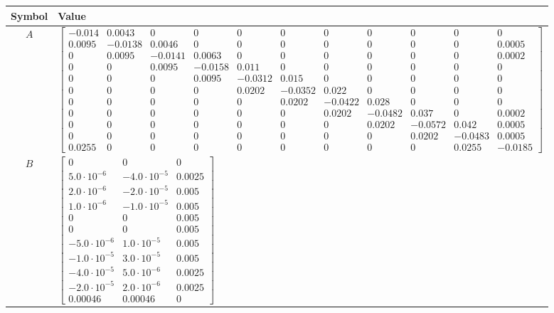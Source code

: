 \begin{tabular}{cl}
\hline
  Symbol  & Value                                                                                                                                                                                                                                                                                                                                                                                                                                                                                                                                                                                                                                                                                                                               \\
\hline
   $A$    & $\left[\begin{array}{ccccccccccc}-0.014 & 0.0043 & 0 & 0 & 0 & 0 & 0 & 0 & 0 & 0 & 0\\0.0095 & -0.0138 & 0.0046 & 0 & 0 & 0 & 0 & 0 & 0 & 0 & 0.0005\\0 & 0.0095 & -0.0141 & 0.0063 & 0 & 0 & 0 & 0 & 0 & 0 & 0.0002\\0 & 0 & 0.0095 & -0.0158 & 0.011 & 0 & 0 & 0 & 0 & 0 & 0\\0 & 0 & 0 & 0.0095 & -0.0312 & 0.015 & 0 & 0 & 0 & 0 & 0\\0 & 0 & 0 & 0 & 0.0202 & -0.0352 & 0.022 & 0 & 0 & 0 & 0\\0 & 0 & 0 & 0 & 0 & 0.0202 & -0.0422 & 0.028 & 0 & 0 & 0\\0 & 0 & 0 & 0 & 0 & 0 & 0.0202 & -0.0482 & 0.037 & 0 & 0.0002\\0 & 0 & 0 & 0 & 0 & 0 & 0 & 0.0202 & -0.0572 & 0.042 & 0.0005\\0 & 0 & 0 & 0 & 0 & 0 & 0 & 0 & 0.0202 & -0.0483 & 0.0005\\0.0255 & 0 & 0 & 0 & 0 & 0 & 0 & 0 & 0 & 0.0255 & -0.0185\end{array}\right]$ \\
   $B$    & $\left[\begin{matrix}0 & 0 & 0\\5.0 \cdot 10^{-6} & -4.0 \cdot 10^{-5} & 0.0025\\2.0 \cdot 10^{-6} & -2.0 \cdot 10^{-5} & 0.005\\1.0 \cdot 10^{-6} & -1.0 \cdot 10^{-5} & 0.005\\0 & 0 & 0.005\\0 & 0 & 0.005\\-5.0 \cdot 10^{-6} & 1.0 \cdot 10^{-5} & 0.005\\-1.0 \cdot 10^{-5} & 3.0 \cdot 10^{-5} & 0.005\\-4.0 \cdot 10^{-5} & 5.0 \cdot 10^{-6} & 0.0025\\-2.0 \cdot 10^{-5} & 2.0 \cdot 10^{-6} & 0.0025\\0.00046 & 0.00046 & 0\end{matrix}\right]$                                                                                                                                                                                                                                                                          \\

\end{tabular}
